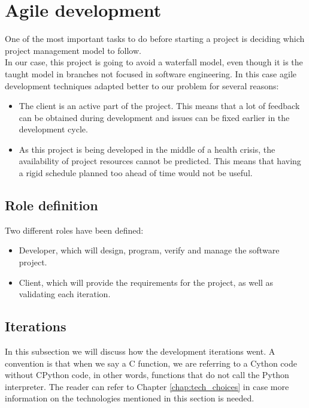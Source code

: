 \section{Agile development}

    One of the most important tasks to do before starting a project is deciding
    which project management model to follow.\\

    In our case, this project is going to avoid a waterfall model, even though it is the taught model in branches  not focused
    in software engineering. In this case  agile development techniques adapted better to
    our problem for several reasons:
    \begin{itemize}
      \item The client is an active part of the project. This means that
      a lot of feedback can be obtained during development and issues can be fixed earlier in the development cycle.
      \item As this project is being developed in the middle of a health crisis,
      the availability of project resources cannot be predicted. This means
      that having a rigid schedule planned too ahead of time would not  be
      useful.
    \end{itemize}

    \subsection{Role definition}

    Two different roles have been defined:
    \begin{itemize}
      \item Developer, which will design, program, verify and manage the
      software project.
      \item Client, which will provide the requirements for the project, as well
      as validating each iteration.
    \end{itemize}

    \subsection{Iterations}

      In this subsection we will discuss how the development iterations went.
      A convention is that when we say a C function, we are referring to a Cython
      code without CPython code, in other words, functions that do not call the
      Python interpreter. The reader can refer to Chapter \ref{chap:tech_choices}
      in case more information on the technologies mentioned in this
      section is needed.


